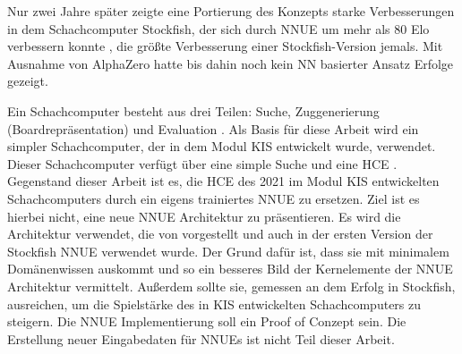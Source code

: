 Nur zwei Jahre später zeigte eine Portierung des Konzepts starke Verbesserungen in dem Schachcomputer Stockfish, der sich durch \ac{NNUE} um mehr als 80 Elo verbessern konnte \cite{StockfishIntroducingNNUE}, die größte Verbesserung einer Stockfish-Version jemals. Mit Ausnahme von AlphaZero \cite{Silver2017} hatte bis dahin noch kein \ac{NN} basierter Ansatz Erfolge gezeigt.


Ein Schachcomputer besteht aus drei Teilen: Suche, Zuggenerierung (Boardrepräsentation) und Evaluation \cite{VazquezFernandez2013}. Als Basis für diese Arbeit wird ein simpler Schachcomputer, der in dem Modul \ac{KIS} entwickelt wurde, verwendet. Dieser Schachcomputer verfügt über eine simple Suche und eine \ac{HCE} \cite{nopy}. Gegenstand dieser Arbeit ist es, die \ac{HCE} des 2021 im Modul \ac{KIS} entwickelten Schachcomputers durch ein eigens trainiertes \ac{NNUE} zu ersetzen. Ziel ist es hierbei nicht, eine neue \ac{NNUE} Architektur zu präsentieren. Es wird die Architektur verwendet, die von \citeauthor{YNasu2018} \cite{YNasu2018} vorgestellt und auch in der ersten Version der Stockfish \ac{NNUE} verwendet wurde. Der Grund dafür ist, dass sie mit minimalem Domänenwissen auskommt und so ein besseres Bild der Kernelemente der \ac{NNUE} Architektur vermittelt. Außerdem sollte sie, gemessen an dem Erfolg in Stockfish, ausreichen, um die Spielstärke des in \ac{KIS} entwickelten Schachcomputers zu steigern.
Die \ac{NNUE} Implementierung soll ein Proof of Conzept sein. Die Erstellung neuer Eingabedaten für \acp{NNUE} ist nicht Teil dieser Arbeit.